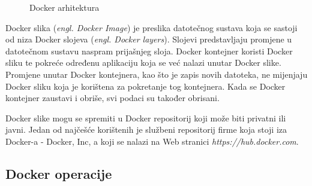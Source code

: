 \begin{figure}[h]
    \centering

    \caption{Docker arhitektura}%
    \label{fig:02docker}
\end{figure}

Docker slika (\textit{engl. Docker Image}) je preslika datotečnog sustava koja se sastoji od niza
Docker slojeva (\textit{engl. Docker layers}). Slojevi predstavljaju promjene u datotečnom sustavu
naspram prijašnjeg sloja. Docker kontejner koristi Docker sliku te pokreće određenu aplikaciju koja
se već nalazi unutar Docker slike. Promjene unutar Docker kontejnera, kao što je zapis novih
datoteka, ne mijenjaju Docker sliku koja je korištena za pokretanje tog kontejnera. Kada se Docker
kontejner zaustavi i obriše, svi podaci su također obrisani.

Docker slike mogu se spremiti u Docker repositorij koji može biti privatni ili javni. Jedan od
najčešće korištenih je službeni repositorij firme koja stoji iza Docker-a - Docker, Inc, a koji se
nalazi na Web stranici \textit{https://hub.docker.com}.

\subsection{Docker operacije}

